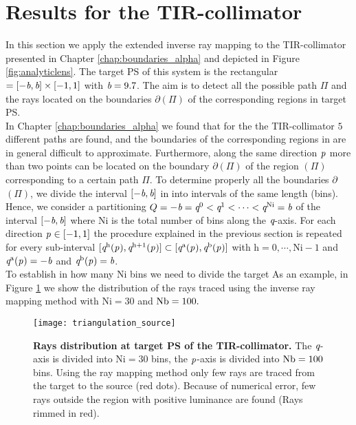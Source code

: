 \section{Results for the TIR-collimator}\label{sec:TIR}
In this section we apply the extended inverse ray mapping to the TIR-collimator presented in Chapter \ref{chap:boundaries_alpha} and depicted in Figure \ref{fig:analyticlens}. The target PS of this system is the rectangular $= [-\textit{b}, \textit{b}]\times[-1,1]$ with $\textit{b}=9.7$. The aim is to detect all the possible path $\Pi$ and the rays located on the boundaries $\partial$$(\Pi)$ of the corresponding regions in target PS. 
\\ \indent In Chapter \ref{chap:boundaries_alpha} we found that for the the TIR-collimator $5$ different paths are found, and the boundaries of the corresponding regions in  are in general difficult to approximate. Furthermore, along the same direction $\textit{p}_{\textrm{} \textit{}}$ more than two points can be located on the boundary $\partial$$(\Pi)$ of the region $(\Pi)$ corresponding to a certain path $\Pi$. To determine properly all the boundaries 
$\partial$$(\Pi)$, we divide the interval $[-\textit{b}, \textit{b}]$ in 
 into intervals of the same length (bins). Hence, we consider a partitioning 
$Q = -\textit{b}=\textit{q}^{0}<\textit{q}^{1}<\cdots<\textit{q}^{\textrm{Ni}}=\textit{b}$ of the interval $[-\textit{b}, \textit{b}]$ where $\textrm{Ni}$ is the total number of bins along the $\textit{q}$-axis.
For each direction $\textit{p}_{\textrm{} \textit{}}\in [-1,1]$ the procedure explained in the previous section is repeated for every sub-interval $[\textit{q}^{\textrm{h}}(\textit{p}_{\textrm{} \textit{}}), \textit{q}^{\textrm{h}+1}(\textit{p}_{\textrm{} \textit{}})]\subset [\textit{q}^{\textrm{a}}(\textit{p}_{\textrm{} \textit{}}), \textit{q}^{\textrm{b}}(\textit{p}_{\textrm{} \textit{}})]$ with $\textrm{h}=0, \cdots, \textrm{Ni}-1$ and $\textit{q}^{\textrm{a}}(\textit{p}_{\textrm{} \textit{}}) = -\textit{b}$ and $\textit{q}^{\textrm{b}}(\textit{p}_{\textrm{} \textit{}}) = \textit{b}$.\\ \indent
To establish in how many \textrm{Ni} bins we need to divide the target 
As an example, in Figure \ref{fig:boundaries_TIR_ray_mapping} we show the distribution of the rays traced using the inverse ray mapping method with $\textrm{Ni}=30$ and $\textrm{Nb} = 100.$ 
\begin{figure}[h]
  \begin{center}
  \texttt{[image: triangulation\_source]}
  \end{center}
  \caption{\textbf{Rays distribution at target PS of the TIR-collimator.}
 The $\textit{q}$-axis is divided into $\textrm{Ni}=30$ bins, the $\textit{p}$-axis is divided into $\textrm{Nb} = 100$ bins. Using the ray mapping method only few rays are traced from the target to the source (red dots). Because of numerical error, few rays outside the region with positive luminance are found (Rays rimmed in red).}
\label{fig:boundaries_TIR_ray_mapping}
 \end{figure}
